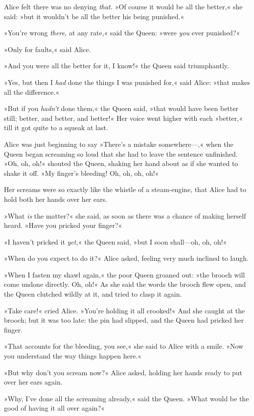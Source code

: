Alice felt there was no denying \textit{that.} »Of course it would be all the better,« she said: »but it wouldn't be all the better his being punished.«

»You're wrong \textit{there,} at any rate,« said the Queen: »were \textit{you} ever punished?«

»Only for faults,« said Alice.

»And you were all the better for it, I know!« the Queen said triumphantly.

»Yes, but then I \textit{had} done the things I was punished for,« said Alice: »that makes all the difference.«

»But if you \textit{hadn't} done them,« the Queen said, »that would have been better still; better, and better, and better!« Her voice went higher with each »better,« till it got quite to a squeak at last.

Alice was just beginning to say »There's a mistake somewhere—,« when the Queen began screaming so loud that she had to leave the sentence unfinished. »Oh, oh, oh!« shouted the Queen, shaking her hand about as if she wanted to shake it off. »My finger's bleeding! Oh, oh, oh, oh!«

Her screams were so exactly like the whistle of a steam-engine, that Alice had to hold both her hands over her ears.

»What \textit{is} the matter?« she said, as soon as there was a chance of making herself heard. »Have you pricked your finger?«

»I haven't pricked it \textit{yet,}« the Queen said, »but I soon shall—oh, oh, oh!«

»When do you expect to do it?« Alice asked, feeling very much inclined to laugh.

»When I fasten my shawl again,« the poor Queen groaned out: »the brooch will come undone directly. Oh, oh!« As she said the words the brooch flew open, and the Queen clutched wildly at it, and tried to clasp it again.

»Take care!« cried Alice. »You're holding it all crooked!« And she caught at the brooch; but it was too late: the pin had slipped, and the Queen had pricked her finger.

»That accounts for the bleeding, you see,« she said to Alice with a smile. »Now you understand the way things happen here.«

»But why don't you scream now?« Alice asked, holding her hands ready to put over her ears again.

»Why, I've done all the screaming already,« said the Queen. »What would be the good of having it all over again?«

